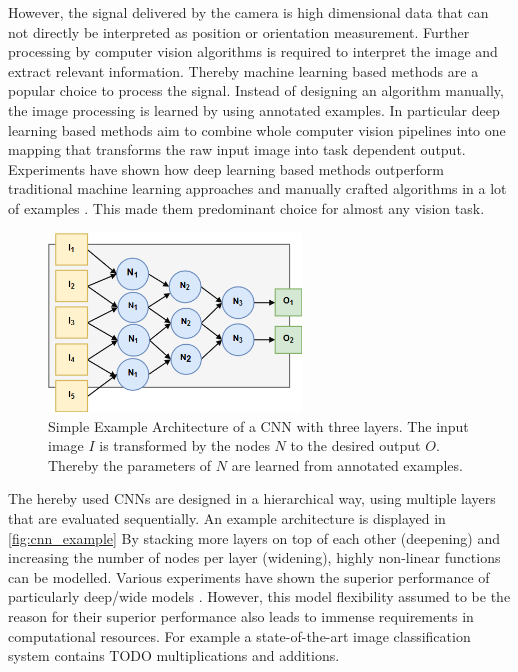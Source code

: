 However, the signal delivered by the camera is high dimensional data that can not directly be interpreted as position or orientation measurement. Further processing by computer vision algorithms is required to interpret the image and extract relevant information. Thereby machine learning based methods are a popular choice to process the signal. Instead of designing an algorithm manually, the image processing is learned by using annotated examples. In particular deep learning based methods aim to combine whole computer vision pipelines into one mapping that transforms the raw input image into task dependent output. Experiments have shown how deep learning based methods outperform traditional machine learning approaches and manually crafted algorithms in a lot of examples \cite{Razavian}. This made them predominant choice for almost any vision task.

\begin{figure}[hbtp]
	\centering
	\includegraphics[width=0.6\textwidth]{fig/cnn_example}
	\caption{Simple Example Architecture of a \ac{CNN} with three layers. The input image $I$ is transformed by the nodes $N$ to the desired output $O$. Thereby the parameters of $N$ are learned from annotated examples.}
	\label{fig:cnn_example}
\end{figure}

The hereby used \acp{CNN} are designed in a hierarchical way, using multiple layers that are evaluated sequentially. An example architecture is displayed in \autoref{fig:cnn_example} By stacking more layers on top of each other (deepening) and increasing the number of nodes per layer (widening), highly non-linear functions can be modelled. Various experiments have shown the superior performance of particularly deep/wide models  \cite{He, He2015, Szegedy2014, Zagoruyko2016}. However, this model flexibility assumed to be the reason for their superior performance also leads to immense requirements in computational resources. For example a state-of-the-art image classification system contains TODO multiplications and additions. 

